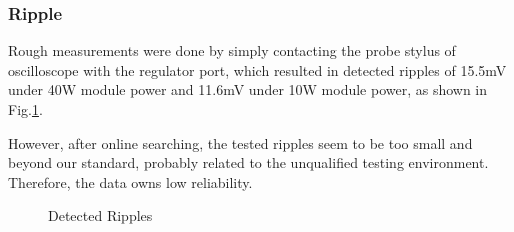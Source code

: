 \documentclass[a4paper,num-refs]{oup-contemporary}
\begin{document}
\subsubsection{Ripple}
Rough measurements were done by simply contacting the probe stylus of oscilloscope with the regulator port, which resulted in detected ripples of 15.5mV under 40W module power and 11.6mV under 10W module power, as shown in Fig.\ref{ripple}.

However, after online searching, the tested ripples seem to be too small and beyond our standard, probably related to the unqualified testing environment. Therefore, the data owns low reliability.

\begin{figure}[h!]
	\centering
	\begin{minipage}{0.45\linewidth}
		\centering
	\end{minipage}
\hfill
	\begin{minipage}{0.45\linewidth}
		\centering
\end{minipage}
\caption{Detected Ripples}
\label{ripple}
\end{figure}
\end{document}
